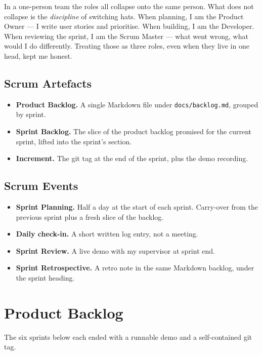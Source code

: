 \documentclass[12pt, a4paper]{report}
\begin{document}
In a one-person team the roles all collapse onto the same person.
What does not collapse is the \emph{discipline} of switching hats.
When planning, I am the Product Owner --- I write user stories and
prioritise. When building, I am the Developer. When reviewing the
sprint, I am the Scrum Master --- what went wrong, what would I do
differently. Treating those as three roles, even when they live in
one head, kept me honest.

\subsection{Scrum Artefacts}

\begin{itemize}
    \item \textbf{Product Backlog.} A single Markdown file under
        \texttt{docs/backlog.md}, grouped by sprint.
    \item \textbf{Sprint Backlog.} The slice of the product backlog
        promised for the current sprint, lifted into the sprint's
        section.
    \item \textbf{Increment.} The git tag at the end of the sprint,
        plus the demo recording.
\end{itemize}

\subsection{Scrum Events}

\begin{itemize}
    \item \textbf{Sprint Planning.} Half a day at the start of each
        sprint. Carry-over from the previous sprint plus a fresh
        slice of the backlog.
    \item \textbf{Daily check-in.} A short written log entry, not a
        meeting.
    \item \textbf{Sprint Review.} A live demo with my supervisor at
        sprint end.
    \item \textbf{Sprint Retrospective.} A retro note in the same
        Markdown backlog, under the sprint heading.
\end{itemize}

\section{Product Backlog}

The six sprints below each ended with a runnable demo and a
self-contained git tag.
\end{document}

